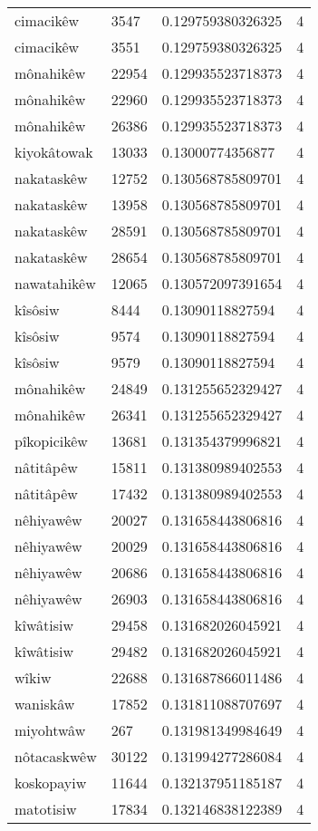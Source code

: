 \begin{longtable}{llll}
cimacikêw & 3547 & 0.129759380326325 & 4 \\
cimacikêw & 3551 & 0.129759380326325 & 4 \\
mônahikêw & 22954 & 0.129935523718373 & 4 \\
mônahikêw & 22960 & 0.129935523718373 & 4 \\
mônahikêw & 26386 & 0.129935523718373 & 4 \\
kiyokâtowak & 13033 & 0.13000774356877 & 4 \\
nakataskêw & 12752 & 0.130568785809701 & 4 \\
nakataskêw & 13958 & 0.130568785809701 & 4 \\
nakataskêw & 28591 & 0.130568785809701 & 4 \\
nakataskêw & 28654 & 0.130568785809701 & 4 \\
nawatahikêw & 12065 & 0.130572097391654 & 4 \\
kîsôsiw & 8444 & 0.13090118827594 & 4 \\
kîsôsiw & 9574 & 0.13090118827594 & 4 \\
kîsôsiw & 9579 & 0.13090118827594 & 4 \\
mônahikêw & 24849 & 0.131255652329427 & 4 \\
mônahikêw & 26341 & 0.131255652329427 & 4 \\
pîkopicikêw & 13681 & 0.131354379996821 & 4 \\
nâtitâpêw & 15811 & 0.131380989402553 & 4 \\
nâtitâpêw & 17432 & 0.131380989402553 & 4 \\
nêhiyawêw & 20027 & 0.131658443806816 & 4 \\
nêhiyawêw & 20029 & 0.131658443806816 & 4 \\
nêhiyawêw & 20686 & 0.131658443806816 & 4 \\
nêhiyawêw & 26903 & 0.131658443806816 & 4 \\
kîwâtisiw & 29458 & 0.131682026045921 & 4 \\
kîwâtisiw & 29482 & 0.131682026045921 & 4 \\
wîkiw & 22688 & 0.131687866011486 & 4 \\
waniskâw & 17852 & 0.131811088707697 & 4 \\
miyohtwâw & 267 & 0.131981349984649 & 4 \\
nôtacaskwêw & 30122 & 0.131994277286084 & 4 \\
koskopayiw & 11644 & 0.132137951185187 & 4 \\
matotisiw & 17834 & 0.132146838122389 & 4 \\

\end{longtable}

